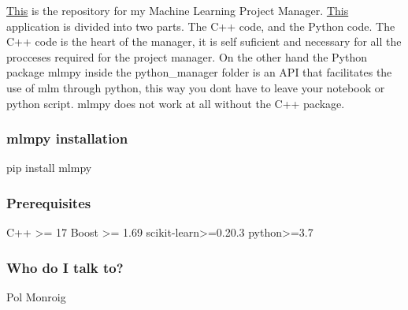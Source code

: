 \mbox{\hyperlink{namespaceThis}{This}} is the repository for my Machine Learning Project Manager. \mbox{\hyperlink{namespaceThis}{This}} application is divided into two parts. The C++ code, and the Python code. The C++ code is the heart of the manager, it is self suficient and necessary for all the procceses required for the project manager. On the other hand the Python package mlmpy inside the python\+\_\+manager folder is an A\+PI that facilitates the use of mlm through python, this way you don\textquotesingle{}t have to leave your notebook or python script. mlmpy does not work at all without the C++ package.

\subsubsection*{mlmpy installation}

\begin{DoxyVerb}pip install mlmpy
\end{DoxyVerb}


\subsubsection*{Prerequisites}

\begin{DoxyVerb}C++ >= 17
Boost >= 1.69
scikit-learn>=0.20.3
python>=3.7
\end{DoxyVerb}


\subsubsection*{Who do I talk to?}

Pol Monroig 